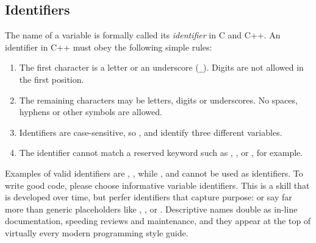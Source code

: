 \subsection{Identifiers}
The name of a variable is formally called its \emph{identifier} in C and C++.
An identifier in C++ must obey the following simple rules:

\begin{enumerate}
  \item 
  The first character is a letter or an underscore (\texttt{\_}).
  Digits are not allowed in the first position.
  \item 
  The remaining characters may be letters, digits or underscores.
  No spaces, hyphens or other symbols are allowed.
  \item 
  Identifiers are case-sensitive, so ,  and  identify three different variables.
  \item 
  The identifier cannot match a reserved keyword such as , , or , for example.
\end{enumerate}

Examples of valid identifiers are , , while ,  and  cannot be used as identifiers.
To write good code, please choose informative variable identifiers.
This is a skill that is developed over time, but perfer identifiers that capture purpose:  or  say far more than generic placeholders like , , or .
Descriptive names double as in-line documentation, speeding reviews and maintenance, and they appear at the top of virtually every modern programming style guide.

